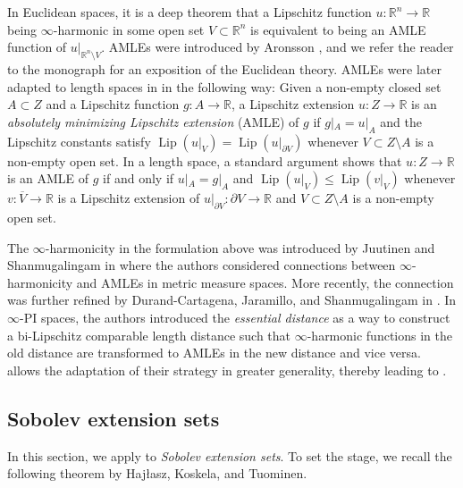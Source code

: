 \documentclass[reqno]{amsart}
\newcommand{\LIP}{{\rm LIP}}
\numberwithin{equation}{section}
\theoremstyle{remark}
\newcommand{\R}{\mathbb{R}}
\DeclareMathOperator{\lip}{Lip}
\begin{document}
In Euclidean spaces, it is a deep theorem that  a Lipschitz function $u \colon \R^n\to\R$ being $\infty$-harmonic in some open set $V\subset\R^n$ is equivalent to being an AMLE function of $u|_{\R^n\setminus V}$. AMLEs were introduced by Aronsson \cite{Aron:67}, and we refer the reader to the monograph \cite{Aron:Cran:Juu:04} for an exposition of the Euclidean theory. AMLEs were later adapted to length spaces in \cite{Juut:02,Per:Schr:Sheff:Wil:09} in the following way: Given a non-empty closed set $A \subset Z$ and a Lipschitz function $g \colon A \rightarrow \mathbb{R}$, a Lipschitz extension $u \colon Z \rightarrow \mathbb{R}$ is an \emph{absolutely minimizing Lipschitz extension} (AMLE) of $g$ if $g|_{A} = u|_{A}$ and the Lipschitz constants satisfy $\lip( u|_{V} ) = \lip( u|_{\partial V} )$ whenever $V \subset Z \setminus A$ is a non-empty open set. In a length space, a standard argument shows that $u \colon Z \rightarrow \mathbb{R}$ is an AMLE of $g$ if and only if $u|_{ A } = g|_{ A }$ and $\lip( u|_{V} ) \leq \lip( v|_{V} )$ whenever $v \colon \overline{V} \rightarrow \mathbb{R}$ is a Lipschitz extension of $u|_{ \partial V } \colon \partial V \rightarrow \mathbb{R}$ and $V \subset Z \setminus A$ is a non-empty open set.

The $\infty$-harmonicity in the formulation above was introduced by Juutinen and Shanmugalingam in \cite{Juut:Shan:06} where the authors considered connections between $\infty$-harmonicity and AMLEs in metric measure spaces. More recently, the connection was further refined by Durand-Cartagena, Jaramillo, and Shanmugalingam in \cite{Dur:Jar:Sha:19}. In $\infty$-PI spaces, the authors introduced the \emph{essential distance} as a way to construct a bi-Lipschitz comparable length distance such that $\infty$-harmonic functions in the old distance are transformed to AMLEs in the new distance and vice versa.  allows the adaptation of their strategy in greater generality, thereby leading to .



%
%
\subsection{Sobolev extension sets}
%
In this section, we apply  to \emph{Sobolev extension sets}. To set the stage, we recall the following theorem by Haj{\l}asz, Koskela, and Tuominen.
\end{document}
